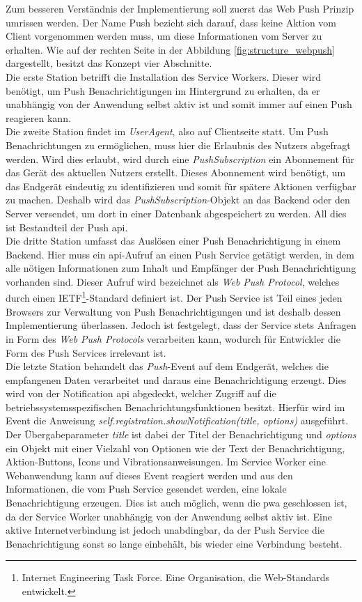 Zum besseren Verständnis der Implementierung soll zuerst das Web Push Prinzip umrissen werden.
Der Name Push bezieht sich darauf, dass keine Aktion vom Client vorgenommen werden muss, um diese Informationen vom Server zu erhalten.
Wie auf der rechten Seite in der Abbildung \ref{fig:structure_webpush} dargestellt, besitzt das Konzept vier Abschnitte.\\
Die erste Station betrifft die Installation des Service Workers.
Dieser wird benötigt, um Push Benachrichtigungen im Hintergrund zu erhalten, da er unabhängig von der Anwendung selbst aktiv ist und somit immer auf einen Push reagieren kann.\\
Die zweite Station findet im \textit{UserAgent}, also auf Clientseite statt.
Um Push Benachrichtungen zu ermöglichen, muss hier die Erlaubnis des Nutzers abgefragt werden.
Wird dies erlaubt, wird durch eine \textit{PushSubscription} ein Abonnement für das Gerät des aktuellen Nutzers erstellt.
Dieses Abonnement wird benötigt, um das Endgerät eindeutig zu identifizieren und somit für spätere Aktionen verfügbar zu machen.
Deshalb wird das \textit{PushSubscription}-Objekt an das Backend oder den Server versendet, um dort in einer Datenbank abgespeichert zu werden.
All dies ist Bestandteil der Push \ac{api}.\\
Die dritte Station umfasst das Auslösen einer Push Benachrichtigung in einem Backend.
Hier muss ein \ac{api}-Aufruf an einen Push Service getätigt werden, in dem alle nötigen Informationen zum Inhalt und Empfänger der Push Benachrichtigung vorhanden sind.
Dieser Aufruf wird bezeichnet als \textit{Web Push Protocol}, welches durch einen IETF\footnote{Internet Engineering Task Force. Eine Organisation, die Web-Standards entwickelt.}-Standard definiert ist.
Der Push Service ist Teil eines jeden Browsers zur Verwaltung von Push Benachrichtigungen und ist deshalb dessen Implementierung überlassen.
Jedoch ist festgelegt, dass der Service stets Anfragen in Form des \textit{Web Push Protocols} verarbeiten kann, wodurch für Entwickler die Form des Push Services irrelevant ist.\\
Die letzte Station behandelt das \textit{Push}-Event auf dem Endgerät, welches die empfangenen Daten verarbeitet und daraus eine Benachrichtigung erzeugt.
Dies wird von der Notification \ac{api} abgedeckt, welcher Zugriff auf die betriebssystemsspezifischen Benachrichtungsfunktionen besitzt.
Hierfür wird im Event die Anweisung \textit{self.registration.showNotifica\-tion(title, options)} ausgeführt.
Der Übergabeparameter \textit{title} ist dabei der Titel der Benachrichtigung und \textit{options} ein Objekt mit einer Vielzahl von Optionen wie der Text der Benachrichtigung, Aktion-Buttons, Icons und Vibrationsanweisungen.%
Im Service Worker eine Webanwendung kann auf dieses Event reagiert werden und aus den Informationen, die vom Push Service gesendet werden, eine lokale Benachrichtigung erzeugen.
Dies ist auch möglich, wenn die \ac{pwa} geschlossen ist, da der Service Worker unabhängig von der Anwendung selbst aktiv ist.
Eine aktive Internetverbindung ist jedoch unabdingbar, da der Push Service die Benachrichtigung sonst so lange einbehält, bis wieder eine Verbindung besteht.

